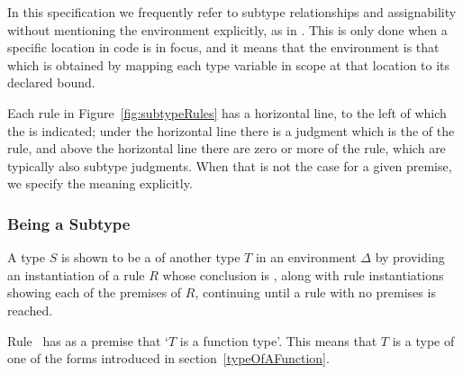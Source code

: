 \documentclass[makeidx]{article}
\begin{document}
{

\LMHash{}%
In this specification we frequently refer to
subtype relationships and assignability
without mentioning the environment explicitly,
as in
.
This is only done when a specific location in code is in focus,
and it means that the environment is that which is obtained
by mapping each type variable in scope at that location
to its declared bound.

\LMHash{}%
Each rule in Figure~\ref{fig:subtypeRules} has a horizontal line,
to the left of which the  is indicated;
under the horizontal line there is a judgment which is the
of the rule,
and above the horizontal line there are zero or more
of the rule,
which are typically also subtype judgments.
When that is not the case for a given premise,
we specify the meaning explicitly.


\subsubsection{Being a Subtype}

\LMHash{}%
A type $S$ is shown to be a  of another type $T$
in an environment $\Delta$ by providing
an instantiation of a rule $R$ whose conclusion is
,
along with rule instantiations showing
each of the premises of $R$,
continuing until a rule with no premises is reached.

\LMHash{}%
Rule~\SrnRightFunction{} has as a premise that `$T$ is a function type'.
This means that $T$ is a type of one of the forms introduced in
section~\ref{typeOfAFunction}.

}
\end{document}
